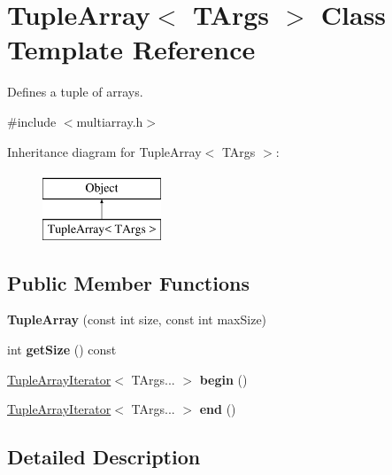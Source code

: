 \hypertarget{classTupleArray}{}\section{Tuple\+Array$<$ T\+Args $>$ Class Template Reference}
\label{classTupleArray}


Defines a tuple of arrays.  




{\ttfamily \#include $<$multiarray.\+h$>$}

Inheritance diagram for Tuple\+Array$<$ T\+Args $>$\+:\begin{figure}[H]
\begin{center}
\leavevmode
\includegraphics[height=2.000000cm]{classTupleArray}
\end{center}
\end{figure}
\subsection*{Public Member Functions}
\begin{DoxyCompactItemize}
\item 
\hypertarget{classTupleArray_a1cd4db2fc0af6ef19d0e15b307c62b2b}{}\label{classTupleArray_a1cd4db2fc0af6ef19d0e15b307c62b2b} 
{\bfseries Tuple\+Array} (const int size, const int max\+Size)
\item 
\hypertarget{classTupleArray_ad718d631f90c1f4dee6856f0adf7c6f4}{}\label{classTupleArray_ad718d631f90c1f4dee6856f0adf7c6f4} 
int {\bfseries get\+Size} () const
\item 
\hypertarget{classTupleArray_aae4dd02767faf2f24a486609205b05af}{}\label{classTupleArray_aae4dd02767faf2f24a486609205b05af} 
\hyperlink{classTupleArrayIterator}{Tuple\+Array\+Iterator}$<$ T\+Args... $>$ {\bfseries begin} ()
\item 
\hypertarget{classTupleArray_a79068612e8f836438b508092c8d04587}{}\label{classTupleArray_a79068612e8f836438b508092c8d04587} 
\hyperlink{classTupleArrayIterator}{Tuple\+Array\+Iterator}$<$ T\+Args... $>$ {\bfseries end} ()
\end{DoxyCompactItemize}


\subsection{Detailed Description}
